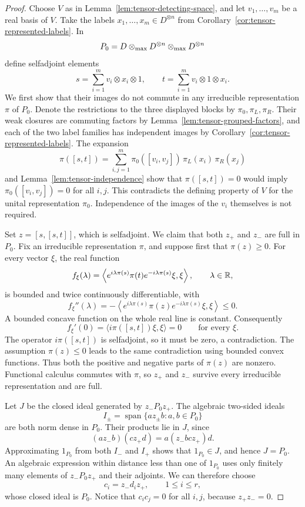 \begin{proof}
Choose \(V\) as in Lemma~\ref{lem:tensor-detecting-space}, and let
\(v_1,\ldots,v_m\) be a real basis of \(V\). Take the labels
\(x_1,\ldots,x_m\in D^{\otimes n}\) from
Corollary~\ref{cor:tensor-represented-labels}. In
\[
                   P_0=D\otimes_{\max} D^{\otimes n}\otimes_{\max} D^{\otimes n}
\]
define selfadjoint elements
\[
 s=\sum_{i=1}^m v_i\otimes x_i\otimes1,
 \qquad
 t=\sum_{i=1}^m v_i\otimes1\otimes x_i.
\]
We first show that their images do not commute in any irreducible
representation \(\pi\) of \(P_0\). Denote the restrictions to the three
displayed blocks by \(\pi_0,\pi_L,\pi_R\). Their weak closures are
commuting factors by Lemma~\ref{lem:tensor-grouped-factors}, and each
of the two label families has independent images by
Corollary~\ref{cor:tensor-represented-labels}. The expansion
\[
 \pi([s,t])=
 \sum_{i,j=1}^m
       \pi_0([v_i,v_j])\,\pi_L(x_i)\,\pi_R(x_j)
\]
and Lemma~\ref{lem:tensor-independence} show that
\(\pi([s,t])=0\) would imply
\(\pi_0([v_i,v_j])=0\) for all \(i,j\).
This contradicts the defining property of \(V\) for the unital
representation \(\pi_0\). Independence of the images of the \(v_i\)
themselves is not required.

Set \(z=[s,[s,t]]\), which is selfadjoint. We claim that both \(z_+\)
and \(z_-\) are full in \(P_0\). Fix an irreducible representation
\(\pi\), and suppose first that \(\pi(z)\ge0\). For every vector
\(\xi\), the real function
\[
 f_\xi(\lambda)=
 \left\langle e^{i\lambda\pi(s)}\pi(t)e^{-i\lambda\pi(s)}
                       \xi,\xi\right\rangle,\qquad \lambda\in\mathbb R,
\]
is bounded and twice continuously differentiable, with
\[
 f_\xi''(\lambda)=
 -\left\langle e^{i\lambda\pi(s)}\pi(z)e^{-i\lambda\pi(s)}
                       \xi,\xi\right\rangle\le0.
\]
A bounded concave function on the whole real line is constant.
Consequently
\[
                f_\xi'(0)=\langle i\pi([s,t])\xi,\xi\rangle=0
                \qquad\text{for every }\xi.
\]
The operator \(i\pi([s,t])\) is selfadjoint, so it must be zero, a
contradiction. The assumption \(\pi(z)\le0\) leads to the same
contradiction using bounded convex functions. Thus both the positive
and negative parts of \(\pi(z)\) are nonzero. Functional calculus commutes with \(\pi\),
so \(z_+\) and \(z_-\) survive every irreducible representation and
are full.

Let \(J\) be the closed ideal generated by \(z_-P_0z_+\).
The algebraic two-sided ideals
\[
 I_\pm=\operatorname{span}\{a z_\pm b:a,b\in P_0\}
\]
are both norm dense in \(P_0\). Their products lie in \(J\), since
\[
             (a z_- b)(c z_+ d)=a(z_-bc z_+)d.
\]
Approximating \(1_{P_0}\) from both \(I_-\) and \(I_+\) shows that
\(1_{P_0}\in J\), and hence \(J=P_0\). An algebraic expression
within distance less than one of \(1_{P_0}\) uses only finitely many
elements of \(z_-P_0z_+\) and their adjoints. We can therefore choose
\[
                   c_i=z_-d_i z_+,\qquad 1\le i\le r,
\]
whose closed ideal is \(P_0\). Notice that \(c_i c_j=0\) for all
\(i,j\), because \(z_+z_-=0\).


\end{proof}
